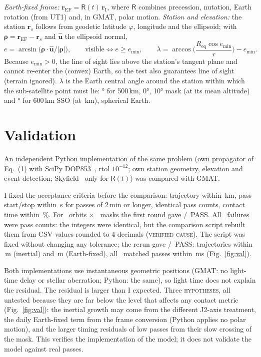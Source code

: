 \documentclass[11pt]{article}
\newcommand{\lbl}[1]{\textsc{#1}}
\begin{document}
\emph{Earth-fixed frame:} $\mathbf r_\mathrm{EF}=\mathsf R(t)\,\mathbf r_\mathrm I$, where $\mathsf R$ combines precession, nutation, Earth rotation (from UT1) and, in GMAT, polar motion. \emph{Station and elevation:} the station $\mathbf r_s$ follows from geodetic latitude $\varphi$, longitude and the ellipsoid; with $\boldsymbol\rho=\mathbf r_\mathrm{EF}-\mathbf r_s$ and $\hat{\mathbf u}$ the ellipsoid normal,
\begin{equation}
e=\arcsin\!\big(\boldsymbol\rho\cdot\hat{\mathbf u}/|\boldsymbol\rho|\big),\qquad \text{visible}\iff e\ge e_{\min},\qquad \lambda=\arccos\!\Big(\frac{R_\mathrm{eq}\cos e_{\min}}{r}\Big)-e_{\min}.
\end{equation}
Because $e_{\min}>0$, the line of sight lies above the station's tangent plane and cannot re-enter the (convex) Earth, so the test also guarantees line of sight (terrain ignored). $\lambda$ is the Earth central angle around the station within which the sub-satellite point must lie: \LamFive° for 500\,km, 0°, 10° mask (at its mean altitude) and \LamSSO° for 600\,km SSO (at \SSOSixMeanAlt\,km), spherical Earth.

\section{Validation}\label{sec:val}
An independent Python implementation of the same problem (own propagator of Eq.~(1) with SciPy DOP853~\cite{scipy}, rtol $10^{-12}$; own station geometry, elevation and event detection; Skyfield~\cite{skyfield} only for $\mathsf R(t)$) was compared with GMAT.

I fixed the acceptance criteria before the comparison: trajectory within \TolTrajKm\,km, pass start/stop within \TolEventS\,s for passes of 2\,min or longer, identical pass counts, contact time within \TolContactPct\,\%. For \NXOrbits\ orbits $\times$ \NXMasks\ masks the first round gave \ROnePass/\RTotal\ PASS. All \ROneInv\ failures were pass counts: the integers were identical, but the comparison script rebuilt them from CSV values rounded to 4 decimals (\lbl{verified cause}). The script was fixed without changing any tolerance; the rerun gave \RTwoPass/\RTotal\ PASS: trajectories within \TrajInertialM\,m (inertial) and \TrajFixedM\,m (Earth-fixed), all \NMatched\ matched passes within \MaxDtMs\,ms (Fig.~\ref{fig:val}).

Both implementations use instantaneous geometric positions (GMAT: no light-time delay or stellar aberration; Python: the same), so light time does not explain the residual. The residual is larger than I expected. Three \lbl{hypotheses}, all untested because they are far below the level that affects any contact metric (Fig.~\ref{fig:val}): the inertial growth may come from the different J2-axis treatment, the daily Earth-fixed term from the frame conversion (Python applies no polar motion), and the larger timing residuals of low passes from their slow crossing of the mask. This verifies the implementation of the model; it does not validate the model against real passes.
\end{document}
